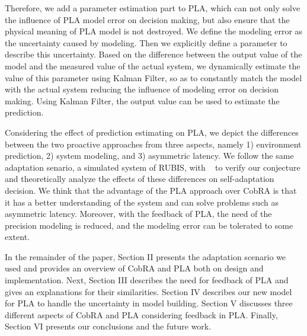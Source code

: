 \documentclass[sigconf]{acmart}
\begin{document}
	
	Therefore, we add a parameter estimation part to PLA, which can not only solve the influence of PLA model error on decision making, but also ensure that the physical meaning of PLA model is not destroyed. We define the modeling error as the uncertainty caused by modeling. Then we explicitly define a parameter to describe this uncertainty. Based on the difference between the output value of the model and the measured value of the actual system, we dynamically estimate the value of this parameter using Kalman Filter, so as to constantly match the model with the actual system reducing the influence of modeling error on decision making. Using Kalman Filter, the output value can be used to estimate the prediction.
	
	
	Considering the effect of prediction estimating on PLA, we depict the differences between the two proactive approaches from three aspects, namely 1) environment prediction, 2) system modeling, and 3) asymmetric latency. We follow the same adaptation senario, a simulated system of RUBIS, with ~\cite{moreno2017comparing} to verify our conjecture and theoretically analyze the effects of these differences on self-adaptation decision. 
	We think that the advantage of the PLA approach over CobRA is that it has a better understanding of the system and can solve problems such as asymmetric latency. Moreover, with the feedback of PLA, the need of the precision modeling is reduced, and the modeling error can be tolerated to some extent.%
	
	
	In the remainder of the paper, Section II presents the adaptation scenario we used and provides an overview of CobRA and PLA both on design and implementation. Next, Section III describes the need for feedback of PLA and gives an explanations for their similarities. Section IV describes our new model for PLA to handle the uncertainty in model building. Section V discusses three different aspects of CobRA and PLA considering feedback in PLA. Finally, Section VI presents our conclusions and the future work.
\end{document}
